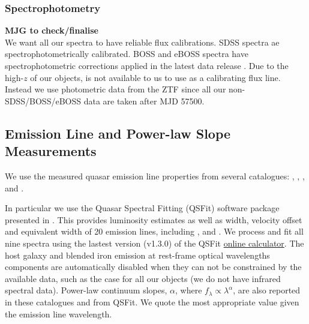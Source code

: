 \documentclass[fleqn,usenatbib]{mnras}
\begin{document}
\subsubsection{Spectrophotometry}
{\bf MJG to check/finalise} \\
We want all our spectra to have reliable flux calibrations.  SDSS
spectra ae spectrophotometrically calibrated.  BOSS and eBOSS spectra
have spectrophotometric corrections applied in the latest data release
\citep{Hutchinson2016, Jensen2016, Margala2016}.  Due to the high-$z$
of our objects, \oiii is not available to us to use as a calibrating
flux line. Instead we use photometric data from the ZTF since all our
non-SDSS/BOSS/eBOSS data are taken after MJD 57500.

\subsection{Emission Line and Power-law Slope Measurements}
We use the measured quasar emission line properties from several catalogues: 
\citet{Shen2011}, \citet{Hamann2017}, \citet{Kozlowski2017}, and
\citet{Calderone2017}.

In particular we use the Quasar Spectral Fitting (QSFit) software
package presented in \citet{Calderone2017}. This provides luminosity
estimates as well as width, velocity offset and equivalent width of 20
emission lines, including \civ, \ciii and \mgii.  We process and fit
all nine spectra using the lastest version (v1.3.0) of the QSFit
\href{https://qsfit.inaf.it/cat_1.30/onlinefit.php}{online
calculator}. The host galaxy and blended iron emission at rest-frame
optical wavelengths components are automatically disabled when they
can not be constrained by the available data, such as the case for all
our objects (we do not have infrared spectral data).  Power-law
continuum slopes, $\alpha$, where $f_{\lambda} \propto
\lambda^{\alpha}$, are also reported in these catalogues and from
QSFit.  We quote the most appropriate value given the emission line
wavelength.



\end{document}
